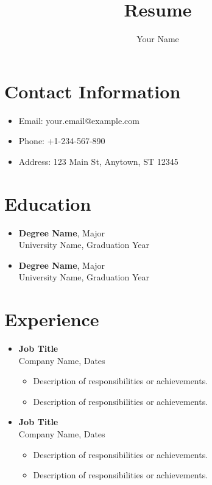 \documentclass[a4paper,10pt]{article}
\title{Resume}
\author{Your Name}
\date{} %
\begin{document}
\maketitle

\section*{Contact Information}
\begin{itemize}
    \item Email: your.email@example.com
    \item Phone: +1-234-567-890
    \item Address: 123 Main St, Anytown, ST 12345
\end{itemize}

\section*{Education}
\begin{itemize}
    \item \textbf{Degree Name}, Major \\
    University Name, Graduation Year
    \item \textbf{Degree Name}, Major \\
    University Name, Graduation Year
\end{itemize}

\section*{Experience}
\begin{itemize}
    \item \textbf{Job Title} \\
    Company Name, Dates \\
    \begin{itemize}
        \item Description of responsibilities or achievements.
        \item Description of responsibilities or achievements.
    \end{itemize}
    
    \item \textbf{Job Title} \\
    Company Name, Dates \\
    \begin{itemize}
        \item Description of responsibilities or achievements.
        \item Description of responsibilities or achievements.
    \end{itemize}
\end{itemize}
\end{document}
